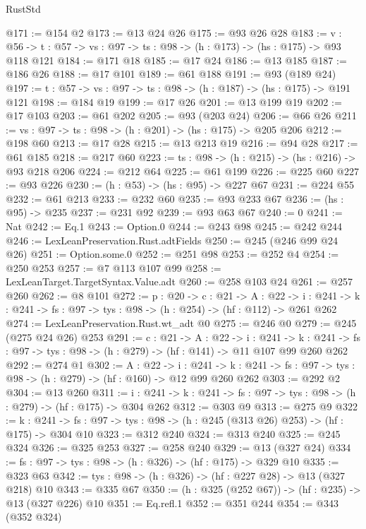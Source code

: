 \begin{lexlean}{RustStd}
\begin{coremodule}
@171 := @154 @2
@173 := @13 @24 @26
@175 := @93 @26 @28
@183 := {v : @56} ->
  {t : @57} -> {vs : @97} -> {ts : @98} -> (h : @173) -> (hs : @175) -> @93 @118 @121
@184 := @171 @18
@185 := @17 @24
@186 := @13 @185
@187 := @186 @26
@188 := @17 @101
@189 := @61 @188
@191 := @93 (@189 @24)
@197 := {t : @57} -> {vs : @97} -> {ts : @98} -> (h : @187) -> (hs : @175) -> @191 @121
@198 := @184 @19
@199 := @17 @26
@201 := @13 @199 @19
@202 := @17 @103
@203 := @61 @202
@205 := @93 (@203 @24)
@206 := @66 @26
@211 := {vs : @97} -> {ts : @98} -> (h : @201) -> (hs : @175) -> @205 @206
@212 := @198 @60
@213 := @17 @28
@215 := @13 @213 @19
@216 := @94 @28
@217 := @61 @185
@218 := @217 @60
@223 := {ts : @98} -> (h : @215) -> (hs : @216) -> @93 @218 @206
@224 := @212 @64
@225 := @61 @199
@226 := @225 @60
@227 := @93 @226
@230 := (h : @53) -> (hs : @95) -> @227 @67
@231 := @224 @55
@232 := @61 @213
@233 := @232 @60
@235 := @93 @233 @67
@236 := (hs : @95) -> @235
@237 := @231 @92
@239 := @93 @63 @67
@240 := 0
@241 := Nat
@242 := Eq.{1}
@243 := Option.{0}
@244 := @243 @98
@245 := @242 @244
@246 := LexLeanPreservation.Rust.adtFields
@250 := @245 (@246 @99 @24 @26)
@251 := Option.some.{0}
@252 := @251 @98
@253 := @252 @4
@254 := @250 @253
@257 := @7 @113 @107 @99
@258 := LexLeanTarget.TargetSyntax.Value.adt
@260 := @258 @103 @24
@261 := @257 @260
@262 := @8 @101
@272 := {p : @20} ->
  {c : @21} ->
  {A : @22} ->
  {i : @241} -> {k : @241} -> {fs : @97} -> {tys : @98} -> (h : @254) -> (hf : @112) -> @261 @262
@274 := LexLeanPreservation.Rust.wt_adt @0
@275 := @246 @0
@279 := @245 (@275 @24 @26) @253
@291 := {c : @21} ->
  {A : @22} ->
  {i : @241} ->
  {k : @241} -> {fs : @97} -> {tys : @98} -> (h : @279) -> (hf : @141) -> @11 @107 @99 @260 @262
@292 := @274 @1
@302 := {A : @22} ->
  {i : @241} ->
  {k : @241} -> {fs : @97} -> {tys : @98} -> (h : @279) -> (hf : @160) -> @12 @99 @260 @262
@303 := @292 @2
@304 := @13 @260
@311 := {i : @241} ->
  {k : @241} -> {fs : @97} -> {tys : @98} -> (h : @279) -> (hf : @175) -> @304 @262
@312 := @303 @9
@313 := @275 @9
@322 := {k : @241} ->
  {fs : @97} -> {tys : @98} -> (h : @245 (@313 @26) @253) -> (hf : @175) -> @304 @10
@323 := @312 @240
@324 := @313 @240
@325 := @245 @324
@326 := @325 @253
@327 := @258 @240
@329 := @13 (@327 @24)
@334 := {fs : @97} -> {tys : @98} -> (h : @326) -> (hf : @175) -> @329 @10
@335 := @323 @63
@342 := {tys : @98} -> (h : @326) -> (hf : @227 @28) -> @13 (@327 @218) @10
@343 := @335 @67
@350 := (h : @325 (@252 @67)) -> (hf : @235) -> @13 (@327 @226) @10
@351 := Eq.refl.{1}
@352 := @351 @244
@354 := @343 (@352 @324)

\end{coremodule}
\end{lexlean}
